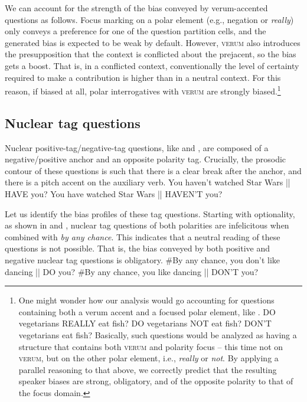 \documentclass[output=paper,colorlinks,citecolor=brown]{langscibook}
\begin{document}
We can account for the strength of the bias conveyed by verum-accented questions as follows. Focus marking on a polar element (e.g., negation or \textit{really}) only conveys a preference for one of the question partition cells, and the generated bias is expected to be weak by default. However, \textsc{verum} also introduces the presupposition that the context is conflicted about the prejacent, so the bias gets a boost. That is, in a conflicted context, conventionally the level of certainty required to make a contribution is higher than in a neutral context. For this reason, if biased at all, polar interrogatives with \textsc{verum} are strongly biased.\footnote{One might wonder how our analysis would go accounting for questions containing both a verum accent and a focused polar element, like .    
\is{}
\ea DO vegetarians REALLY eat fish?\label{VrmRlyQ}
\ex DO vegetarians NOT eat fish?\label{VrmNQ}
\ex DON'T vegetarians eat fish?\label{VrmHNQ}
\z
\il{}
Basically, such questions would be analyzed as having a structure that contains both \textsc{verum} and polarity focus -- this time not on \textsc{verum}, but on the other polar element, i.e., \textit{really} or \textit{not}. By applying a parallel reasoning to that above, we correctly predict that the resulting speaker biases are strong, obligatory, and of the opposite polarity to that of the focus domain.}

\subsection{Nuclear tag questions}
Nuclear positive-tag/negative-tag questions, like  and , are composed of a negative/positive anchor and an opposite polarity tag. Crucially, the prosodic contour of these questions is such that there is a clear break after the anchor, and there is a pitch accent on the auxiliary verb.
\is{}
\ea You haven't watched Star Wars || HAVE you?\label{Pos.Nu}
\ex You have watched Star Wars || HAVEN'T you?\label{Neg.Nu}
\z
{}

Let us identify the bias profiles of these tag questions. Starting with optionality, as shown in  and , nuclear tag questions of both polarities are infelicitous when combined with \textit{by any chance}. This indicates that a neutral reading of these questions is not possible. That is, the bias conveyed by both positive and negative nuclear tag questions is obligatory.
\is{}
\ea \#By any chance, you don't like dancing || DO you?\label{Pos.Nu.BAC}
\ex \#By any chance, you like dancing || DON'T you?\label{Neg.Nu.BAC}
\z
{}
\end{document}
